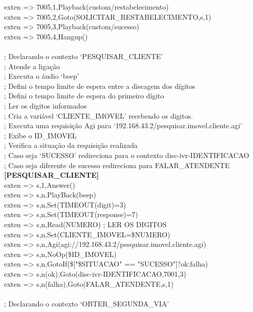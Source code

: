 \begin{apendicesenv}
exten => 7005,1,Playback(custom/restabelecimento) \\
exten => 7005,2,Goto(SOLICITAR\_RESTABELECIMENTO,s,1) \\
exten => 7005,3,Playback(custom/sucesso) \\
exten => 7005,4,Hangup() \\
 \\
; Declarando o contexto ‘PESQUISAR\_CLIENTE’ \\
; Atende a ligação \\
; Executa o áudio ‘beep’ \\
; Defini o tempo limite de espera entre a discagem dos dígitos \\
; Defini o tempo limite de espera do primeiro dígito \\
; Ler os digitos informados \\
; Cria a variável ‘CLIENTE\_IMOVEL’ recebendo os digitos. \\
; Executa uma requisição Agi para ‘192.168.43.2/pesquisar.imovel.cliente.agi’ \\
; Exibe o ID\_IMOVEL \\
; Verifica a situação da requisição realizada \\
; Caso seja ‘SUCESSO’ redireciona para o contexto disc-ivr-IDENTIFICACAO \\
; Caso seja diferente de sucesso redireciona para FALAR\_ATENDENTE \\
\textbf{[PESQUISAR\_CLIENTE]} \\
exten => s,1,Answer() \\
exten => s,n,PlayBack(beep) \\
exten => s,n,Set(TIMEOUT(digit)=3)  \\
exten => s,n,Set(TIMEOUT(response)=7)  \\
exten => s,n,Read(NUMERO) ; LER OS DIGITOS \\
exten => s,n,Set(CLIENTE\_IMOVEL=\${NUMERO}) \\
exten => s,n,Agi(agi://192.168.43.2/pesquisar.imovel.cliente.agi) \\
exten => s,n,NoOp(\${ID\_IMOVEL}) \\
exten => s,n,GotoIf(\$["\${SITUACAO}" == "SUCESSO"]?ok:falha) \\
exten => s,n(ok),Goto(disc-ivr-IDENTIFICACAO,7001,3) \\
exten => s,n(falha),Goto(FALAR\_ATENDENTE,s,1) \\
 \\
; Declarando o contexto ‘OBTER\_SEGUNDA\_VIA’ \\

\end{apendicesenv}
